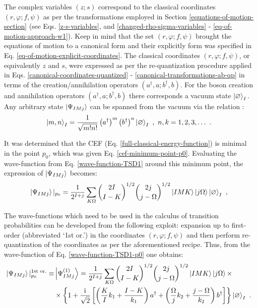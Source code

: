 The complex variables $(z;s)$ correspond to the classical coordinates $(r,\varphi;f,\psi)$ as per the transformations employed in Section \ref{equations-of-motion-section} (see Eqs. \ref{z-s-variables}, and \ref{changed-rho-sigma-variables} - \ref{eq-of-motion-approach-w1}). Keep in mind that the set $(r,\varphi;f,\psi)$ brought the equations of motion to a canonical form and their explicitly form was specified in Eq. \ref{eq-of-motion-explicit-coordinates}. The classical coordinates $(r,\varphi;f,\psi)$, or equivalently $z$ and $s$, were expressed as per the re-quantization procedure applied in Eqs. \ref{canonical-coordinates-quantized} - \ref{canonical-transformations-ab-qp} in terms of the creation/annihilation operators $(a^\dagger,a;b^\dagger,b)$. For the boson creation and annihilation operators $(a^\dagger,a;b^\dagger,b)$ there corresponds a vacuum state $\ket{\varnothing}_I$. Any arbitrary state $\ket{\Psi_{IMj}}$ can be spanned from the vacuum via the relation \cite{raduta2017semiclassical}:
\begin{align}
    \ket{m,n}_I=\frac{1}{\sqrt{m!n!}}\left(a^\dagger\right)^m\left(b^\dagger\right)^n\ket{\varnothing}_I\ ,\ n,k=1,2,3,\dots\ .
\end{align}

It was determined that the CEF (Eq. \ref{full-classical-energy-function}) is minimal in the point $p_0$, which was given Eq. \ref{cef-minimum-point-p0}. Evaluating the wave-function from Eq. \ref{wave-function-TSD1} around this minimum point, the expression of $\ket{\Psi_{IMj}}$ becomes:
\begin{align}
    \ket{\Psi_{IMj}}|_{p_0}=\frac{1}{2^{I+j}}\sum_{K\Omega}\binom{2I}{I-K}^{1/2}\binom{2j}{j-\Omega}^{1/2}\ket{IMK}\ket{j\Omega}\ket{\varnothing}_I\ ,
    \label{wave-function-TSD1-p0}
\end{align}

The wave-functions which need to be used in the calculus of transition probabilities can be developed from the following exploit: expansion up to first-order (abbreviated `1st or.') in the coordinates $(r,\varphi;f,\psi)$ and then perform re-quantization of the coordinates as per the aforementioned recipe. Thus, from the wave-function of Eq. \ref{wave-function-TSD1-p0} one obtains:
\begin{align}
    \ket{\Psi_{IMj}}|_{p_0}^{\text{1st or.}}\equiv&\ket{\Psi_{IMj}^{(1)}}=\frac{1}{2^{I+j}}\sum_{K\Omega}\binom{2I}{I-K}^{1/2}\binom{2j}{j-\Omega}^{1/2}\ket{IMK}\ket{j\Omega}\times\nonumber\\
                           &\times\left\{1+\frac{\iu}{\sqrt{2}}\left[\left(\frac{K}{I}k_1+\frac{I-K}{k_1}\right)a^\dagger+\left(\frac{\Omega}{j}k_2+\frac{j-\Omega}{k_2}\right)b^\dagger\right]\right\}\ket{\varnothing}_I\ .
    \label{wave-function-TSD1-p0-first-order}
\end{align}

